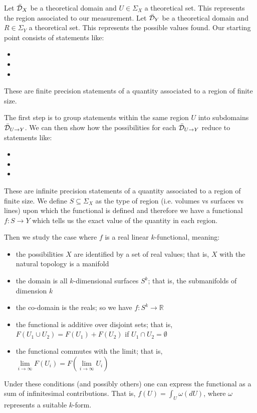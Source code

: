 \documentclass[11pt,letterpaper,fleqn]{memoir} %
\begin{document}
Let $\bar{\mathcal{D}}_X$ be a theoretical domain and $U \in \Sigma_X$ a theoretical set. This represents the region associated to our measurement. Let $\bar{\mathcal{D}}_Y$ be a theoretical domain and $R \in \Sigma_Y$ a theoretical set. This represents the possible values found. Our starting point consists of statements like:
\begin{itemize}
	\item {}
	\item {}
	\item {}
\end{itemize}
These are finite precision statements of a quantity associated to a region of finite size.

The first step is to group statements within the same region $U$ into subdomains $\bar{\mathcal{D}}_{U\to Y}$. We can then show how the possibilities for each $\bar{\mathcal{D}}_{U\to Y}$ reduce to statements like:
\begin{itemize}
	\item {}
	\item {}
	\item {}
\end{itemize}
These are infinite precision statements of a quantity associated to a region of finite size. We define $S \subseteq \Sigma_X$ as the type of region (i.e. volumes vs surfaces vs lines) upon which the functional is defined and therefore we have a functional $f : S \to Y$ which tells us the exact value of the quantity in each region.

Then we study the case where $f$ is a real linear $k$-functional, meaning:
\begin{itemize}
	\item the possibilities $X$ are identified by a set of real values; that is, $X$ with the natural topology is a manifold
	\item the domain is all $k$-dimensional surfaces $S^k$; that is, the submanifolds of dimension $k$
	\item the co-domain is the reals; so we have $f : S^k \to \mathbb{R}$
	\item the functional is additive over disjoint sets; that is, $F(U_1 \cup U_2) = F(U_1) + F(U_2)$ if $U_1 \cap U_2 = \emptyset$
	\item the functional commutes with the limit; that is, $\lim\limits_{i \to \infty} F(U_i) = F(\lim\limits_{i \to \infty} U_i)$
\end{itemize}
Under these conditions (and possibly others) one can express the functional as a sum of infinitesimal contributions. That is, $f(U) = \int_U \omega(dU)$, where $\omega$ represents a suitable $k$-form.
\end{document}
